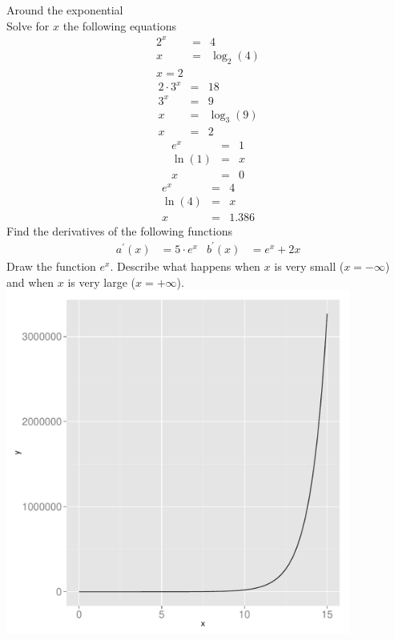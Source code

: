 \documentclass[a4paper]{report}
\begin{document}
\begin{Answer}[ref=exexln]
\Question Around the exponential\\ 
\subQuestion Solve for $x$ the following equations
\begin{eqnarray*}
2^x&=&4\\
x&=&\log_2(4)\\
x=2
\end{eqnarray*}
\begin{eqnarray*}
2 \cdot 3^x &=&18\\
3^x&=&9\\
x&=& \log_3(9)\\
x&=&2
\end{eqnarray*}
\begin{eqnarray*}
e^x &=&1\\
\ln(1)&=&x\\
x&=&0
\end{eqnarray*}
\begin{eqnarray*}
e^x &=&4\\
\ln(4)&=&x\\
x&=&1.386
\end{eqnarray*}
\subQuestion Find the derivatives of the following functions
\begin{align*}
a^\prime(x) &= 5\cdot e^x			&  b^\prime(x)&=e^x + 2x 
\end{align*}
\subQuestion Draw the function $e^x$. Describe what happens when $x$ is very small ($x=- \infty$) and when $x$ is very large ($x=+\infty$).\\
\includegraphics[width=0.85\textwidth]{exponential_plot.pdf}\\

\end{Answer}
\end{document}
